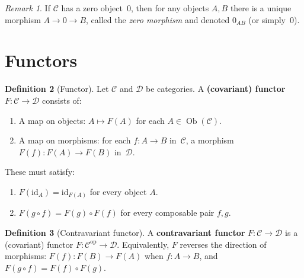 \documentclass[a4paper,12pt]{book}
\DeclareMathOperator{\Ob}{Ob}
\newcommand{\op}{\mathrm{op}}
\newcommand{\id}{\mathrm{id}}
\theoremstyle{definition}
\newtheorem{definition}{Definition}[section]
\theoremstyle{plain}
\theoremstyle{remark}
\newtheorem{remark}[definition]{Remark}
\begin{document}
\begin{remark}\label{rem:zero-morphism}
If $\mathcal{C}$ has a zero object~$0$, then for any objects $A,B$ there
is a unique morphism $A\to 0\to B$, called the \emph{zero morphism}
and denoted $0_{AB}$ (or simply~$0$).
\end{remark}


\section{Functors}\label{sec:functors}


\begin{definition}[Functor]\label{def:functor}
Let $\mathcal{C}$ and $\mathcal{D}$ be categories.
A \textbf{(covariant) functor} $F\colon\mathcal{C}\to\mathcal{D}$
consists of:
\begin{enumerate}[label=(\roman*)]
    \item A map on objects:
          $A\mapsto F(A)$ for each $A\in\Ob(\mathcal{C})$.
    \item A map on morphisms: for each $f\colon A\to B$ in~$\mathcal{C}$,
          a morphism $F(f)\colon F(A)\to F(B)$ in~$\mathcal{D}$.
\end{enumerate}
These must satisfy:
\begin{enumerate}[label=\textbf{(F\arabic*)}]
    \item $F(\id_A) = \id_{F(A)}$ for every object $A$.
    \item $F(g\circ f) = F(g)\circ F(f)$ for every composable pair
          $f,g$.
\end{enumerate}
\end{definition}

\begin{definition}[Contravariant functor]\label{def:contravariant}
A \textbf{contravariant functor} $F\colon\mathcal{C}\to\mathcal{D}$ is
a (covariant) functor $F\colon\mathcal{C}^{\op}\to\mathcal{D}$.
Equivalently, $F$ reverses the direction of morphisms:
$F(f)\colon F(B)\to F(A)$ when $f\colon A\to B$, and
$F(g\circ f) = F(f)\circ F(g)$.
\end{definition}
\end{document}
